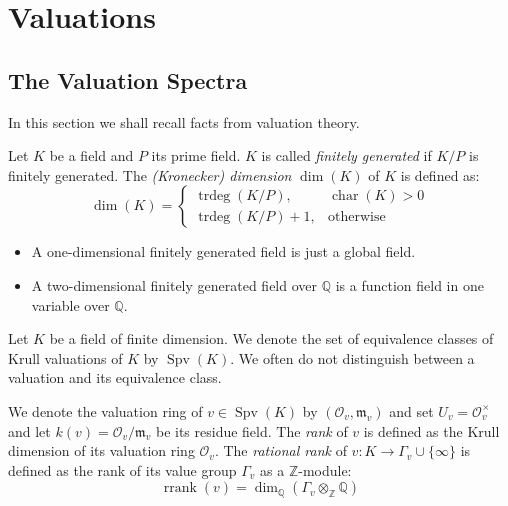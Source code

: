 \chapter{Valuations}

\section{The Valuation Spectra}

In this section we shall recall facts from valuation theory.

\begin{definition}
Let $K$ be a field and $P$ its prime field. $K$ is called \textit{finitely generated} if $K/P$ is finitely generated. The \textit{(Kronecker) dimension} $\dim(K)$ of $K$ is defined as:
\[\dim(K) = \begin{cases}
\operatorname{trdeg}(K/P), & \operatorname{char}(K)>0\\
\operatorname{trdeg}(K/P)+1, & \text{otherwise}
\end{cases} \]
\end{definition}

\begin{remark}
\begin{itemize}
\item A one-dimensional finitely generated field is just a global field. 
\item A two-dimensional finitely generated field over $\mathbb{Q}$ is a function field in one variable over $\mathbb{Q}$.
\end{itemize}
\end{remark}

\begin{definition}\label{2.1}
Let $K$ be a field of finite dimension. We denote the set of equivalence classes of Krull valuations of $K$ by $\operatorname{Spv}(K)$. We often do not distinguish between a valuation and its equivalence class. 

We denote the valuation ring of $v\in\operatorname{Spv}(K)$ by $(\mathcal{O}_v,\mathfrak{m}_v)$ and set $U_v=\mathcal{O}_v^\times$ and let $k(v)=\mathcal{O}_v/\mathfrak{m}_v$ be its residue field. The \textit{rank} of $v$ is defined as the Krull dimension of its valuation ring $\mathcal{O}_v$. The \textit{rational rank} of $v:K\to\Gamma_v\cup\{\infty\}$ is defined as the rank of its value group $\Gamma_v$ as a $\mathbb{Z}$-module:
\[\operatorname{rrank}(v) = \dim_\mathbb{Q}(\Gamma_v\otimes_\mathbb{Z}\mathbb{Q}) \]
\end{definition}


